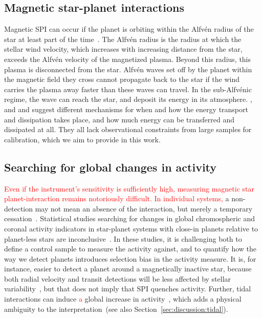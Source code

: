 \documentclass[twocolumn]{aastex631}
\begin{document}
\subsection{Magnetic star-planet interactions}
\label{sec:intro:mspi}
Magnetic SPI can occur if the planet is orbiting within the Alfv\'en radius of the star at least part of the time~\citep{preusse2006magnetic, cohen2011dynamics}. The Alfv\'en radius is the radius at which the stellar wind velocity, which increases with increasing distance from the star, exceeds the Alfv\'en velocity of the magnetized plasma. Beyond this radius, this plasma is disconnected from the star. Alfv\'en waves set off by the planet within the magnetic field they cross cannot propagate back to the star if the wind carries the plasma away faster than these waves can travel. In the sub-Alfv\'enic regime, the wave can reach the star, and deposit its energy in its atmosphere. \citet{lanza2012starplanet, lanza2018closeby}, and \citet{zarka2007plasma} and \citet{saur2013magnetic} suggest different mechanisms for when and how the energy transport and dissipation takes place, and how much energy can be transferred and dissipated at all. They all lack observational constraints from large samples for calibration, which we aim to provide in this work.

\subsection{Searching for global changes in activity}
\label{sec:intro:global}
\textcolor{red}{Even if the instrument's sensitivity is sufficiently high, measuring magnetic star planet-interaction remains notoriously difficult. In individual systems,} a non-detection may not mean an absence of the interaction, but merely a temporary cessation~\citep{shkolnik2005hot, shkolnik2008nature}. Statistical studies searching for changes in global chromospheric and coronal activity indicators in star-planet systems with close-in planets relative to planet-less stars are inconclusive~\citep{kashyap2008extrasolar,scharf2010possible, shkolnik2013ultraviolet, france2018farultraviolet, viswanath2020statistical, krejcova2012evidence, miller2015comprehensive, poppenhaeger2010coronal}. In these studies, it is challenging both to define a control sample to measure the activity against, and to quantify how the way we detect planets introduces selection bias in the activity measure. It is, for instance, easier to detect a planet around a magnetically inactive star, because both radial velocity and transit detections will be less affected by stellar variability~\citep{poppenhaeger2011correlation}, but that does not imply that SPI quenches activity. Further, tidal interactions can induce \textcolor{red}{a} global increase in activity~\citep{ilic2022tidal}, which adds a physical ambiguity to the interpretation~(see also Section~\ref{sec:discussion:tidal}). 
\end{document}
